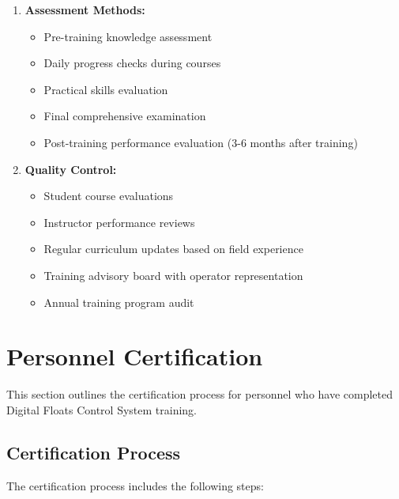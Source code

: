 \documentclass[12pt,a4paper,twoside,openright]{book}
\begin{document}
\begin{enumerate}
    \item \textbf{Assessment Methods:}
    \begin{itemize}
        \item Pre-training knowledge assessment
        \item Daily progress checks during courses
        \item Practical skills evaluation
        \item Final comprehensive examination
        \item Post-training performance evaluation (3-6 months after training)
    \end{itemize}
    
    \item \textbf{Quality Control:}
    \begin{itemize}
        \item Student course evaluations
        \item Instructor performance reviews
        \item Regular curriculum updates based on field experience
        \item Training advisory board with operator representation
        \item Annual training program audit
    \end{itemize}
\end{enumerate}

\section{Personnel Certification}

This section outlines the certification process for personnel who have completed Digital Floats Control System training.

\subsection{Certification Process}

The certification process includes the following steps:
\end{document}
